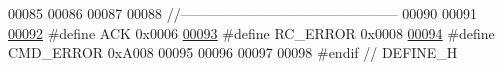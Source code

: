 \begin{DoxyCode}
00085 
00086 
00087 
00088 \textcolor{comment}{//-----------------------------------------------}
00090 \textcolor{comment}{}
00091 
\hypertarget{a00090_source_l00092}{}\hyperlink{a00090_a6f6489887e08bff4887d0bc5dcf214d8}{00092} \textcolor{preprocessor}{#define    ACK                                                  0x0006}
\hypertarget{a00090_source_l00093}{}\hyperlink{a00090_a993a04d3d34ab3326d1786c66e3aaa1a}{00093} \textcolor{preprocessor}{#define    RC\_ERROR                                             0x0008}
\hypertarget{a00090_source_l00094}{}\hyperlink{a00090_a1764a522e9c1a59a59be8757c69fa494}{00094} \textcolor{preprocessor}{#define    CMD\_ERROR                                            0xA008}
00095 
00096 
00097 
00098 \textcolor{preprocessor}{#endif // DEFINE\_H}
\end{DoxyCode}
